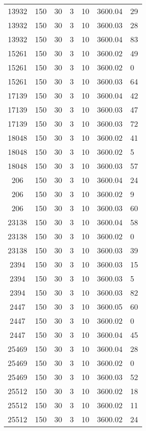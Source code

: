 \begin{tabular}[center]{cccccc}
13932   & 150 & 30 & 3 & 10 & 3600.04 & 29  \\
13932   & 150 & 30 & 3 & 10 & 3600.03 & 28  \\
13932   & 150 & 30 & 3 & 10 & 3600.04 & 83  \\
15261   & 150 & 30 & 3 & 10 & 3600.02 & 49  \\
15261   & 150 & 30 & 3 & 10 & 3600.02 & 0   \\
15261   & 150 & 30 & 3 & 10 & 3600.03 & 64  \\
17139   & 150 & 30 & 3 & 10 & 3600.04 & 42  \\
17139   & 150 & 30 & 3 & 10 & 3600.03 & 47  \\
17139   & 150 & 30 & 3 & 10 & 3600.03 & 72  \\
18048   & 150 & 30 & 3 & 10 & 3600.02 & 41  \\
18048   & 150 & 30 & 3 & 10 & 3600.02 & 5   \\
18048   & 150 & 30 & 3 & 10 & 3600.03 & 57  \\
206     & 150 & 30 & 3 & 10 & 3600.04 & 24  \\
206     & 150 & 30 & 3 & 10 & 3600.02 & 9   \\
206     & 150 & 30 & 3 & 10 & 3600.03 & 60  \\
23138   & 150 & 30 & 3 & 10 & 3600.04 & 58  \\
23138   & 150 & 30 & 3 & 10 & 3600.02 & 0   \\
23138   & 150 & 30 & 3 & 10 & 3600.03 & 39  \\
2394    & 150 & 30 & 3 & 10 & 3600.03 & 15  \\
2394    & 150 & 30 & 3 & 10 & 3600.03 & 5   \\
2394    & 150 & 30 & 3 & 10 & 3600.03 & 82  \\
2447    & 150 & 30 & 3 & 10 & 3600.05 & 60  \\
2447    & 150 & 30 & 3 & 10 & 3600.02 & 0   \\
2447    & 150 & 30 & 3 & 10 & 3600.04 & 45  \\
25469   & 150 & 30 & 3 & 10 & 3600.04 & 28  \\
25469   & 150 & 30 & 3 & 10 & 3600.02 & 0   \\
25469   & 150 & 30 & 3 & 10 & 3600.03 & 52  \\
25512   & 150 & 30 & 3 & 10 & 3600.02 & 18  \\
25512   & 150 & 30 & 3 & 10 & 3600.02 & 11  \\
25512   & 150 & 30 & 3 & 10 & 3600.02 & 24  \\

\end{tabular}
